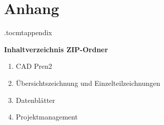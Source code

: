 \newpage

\chapter*{Anhang}
\etocdepthtag.toc{mtappendix}
\addtableofcontents




\textbf{Inhaltverzeichnis ZIP-Ordner}
\begin{enumerate}
    \item CAD Pren2
    \item Übersichtszeichnung und Einzelteilzeichnungen
    \item Datenblätter
    \item Projektmanagement
\end{enumerate}




